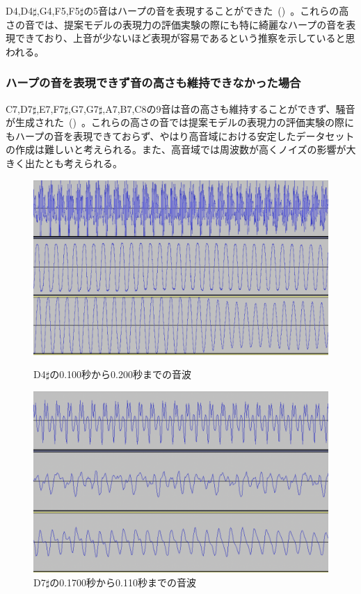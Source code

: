 D4,D4$\sharp$,G4,F5,F5$\sharp$の5音はハープの音を表現することができた~()~。これらの高さの音では、提案モデルの表現力の評価実験の際にも特に綺麗なハープの音を表現できており、上音が少ないほど表現が容易であるという推察を示していると思われる。

\subsubsection{ハープの音を表現できず音の高さも維持できなかった場合}

C7,D7$\sharp$,E7,F7$\sharp$,G7,G7$\sharp$,A7,B7,C8の9音は音の高さも維持することができず、騒音が生成された~()~。これらの高さの音では提案モデルの表現力の評価実験の際にもハープの音を表現できておらず、やはり高音域における安定したデータセットの作成は難しいと考えられる。また、高音域では周波数が高くノイズの影響が大きく出たとも考えられる。

\begin{figure}[b]
\centering
\begin{minipage}{0.48\columnwidth}
\centering
\includegraphics[width=0.85\columnwidth]{figure/66_22_det/d4s_0100_0200.png}
\caption[D4$\sharp$の音波]{D4$\sharp$の0.100秒から0.200秒までの音波}
\label{fig:66_22_near}
\end{minipage}
\begin{minipage}{0.48\columnwidth}
\centering
\includegraphics[width=0.85\columnwidth]{figure/66_22_det/d7s_0100_0110.png}
\caption[D7$\sharp$の音波]{D7$\sharp$の0.1700秒から0.110秒までの音波}
\label{fig:66_22_bad4}
\end{minipage}
\end{figure}

